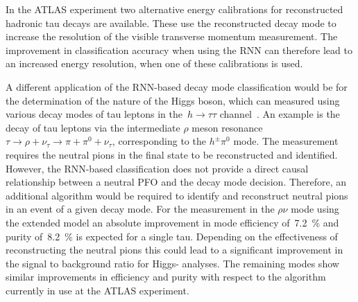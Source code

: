 In the ATLAS experiment two alternative energy calibrations for reconstructed
hadronic tau decays are available. These use the reconstructed decay mode to
increase the resolution of the visible transverse momentum measurement. The
improvement in classification accuracy when using the RNN can therefore lead to
an increased energy resolution, when one of these calibrations is used.

A different application of the RNN-based decay mode classification would be for
the determination of the \cp nature of the Higgs boson, which can measured using
various decay modes of tau leptons in the~$h \to \tau \tau$
channel~\cite{desch_higgs_cp, harnik, Berge2014}. An example is the decay of tau
leptons via the intermediate $\rho$ meson
resonance~$\tau \to \rho + \nu_\tau \to \pi + \pi^0 + \nu_\tau$, corresponding
to the $h^\pm \pi^0$ mode. The \cp measurement requires the neutral pions in the
final state to be reconstructed and identified. However, the RNN-based
classification does not provide a direct causal relationship between a neutral
PFO and the decay mode decision. Therefore, an additional algorithm would be
required to identify and reconstruct neutral pions in an event of a given decay
mode. For the \cp measurement in the $\rho\nu$ mode using the extended model an
absolute improvement in mode efficiency of~\SI{7.2}{\percent} and purity
of~\SI{8.2}{\percent} is expected for a single tau. Depending on the
effectiveness of reconstructing the neutral pions this could lead to a
significant improvement in the signal to background ratio for Higgs-\cp
analyses. The remaining modes show similar improvements in efficiency and purity
with respect to the algorithm currently in use at the ATLAS experiment.

